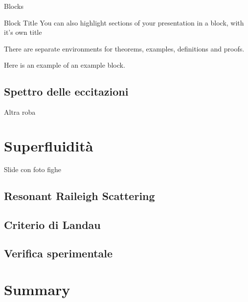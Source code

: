 \documentclass[10pt]{beamer}
\begin{document}
\begin{frame}{Blocks}
\begin{block}{Block Title}
You can also highlight sections of your presentation in a block, with it's own title
\end{block}
\begin{theorem}
There are separate environments for theorems, examples, definitions and proofs.
\end{theorem}
\begin{example}
Here is an example of an example block.
\end{example}
\end{frame}

\subsection{Spettro delle eccitazioni}
\begin{frame}{Altra roba}
\end{frame}


\section{Superfluidità}
\begin{frame}{Slide con foto fighe}
 
\end{frame}

\subsection{Resonant Raileigh Scattering}
\subsection{Criterio di Landau}
\subsection{Verifica sperimentale}

\section*{Summary}
\end{document}
